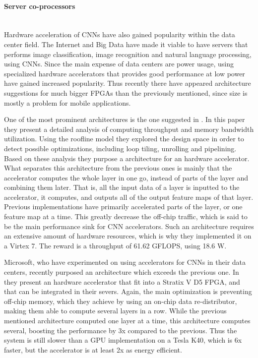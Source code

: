 \paragraph{Server co-processors} \hfil \\
Hardware acceleration of CNNs have also gained popularity within the data center field. The Internet and Big Data have made it viable to have servers that performs image classification, image recognition and natural language processing, using CNNs. Since the main expense of data centers are power usage, using specialized hardware accelerators that provides good performance at low power have gained increased popularity. Thus recently there have appeared architecture suggestions for much bigger FPGAs than the previously mentioned, since size is mostly a problem for mobile applications. 

One of the most prominent architectures is the one suggested in \cite{Zhang2015}. In this paper they present a detailed analysis of computing throughput and memory bandwidth utilization. Using the roofline model \cite{Williams2009} they explored the design space in order to detect possible optimizations, including loop tiling, unrolling and pipelining. Based on these analysis they purpose a architecture for an hardware accelerator. What separates this architecture from the previous ones is mainly that the accelerator computes the whole layer in one go, instead of parts of the layer and combining them later. That is, all the input data of a layer is inputted to the accelerator, it computes, and outputs all of the output feature maps of that layer. Previous implementations have primarily accelerated parts of the layer, or one feature map at a time. This greatly decrease the off-chip traffic, which is said to be the main performance sink for CNN accelerators. Such an architecture requires an extensive amount of hardware resources, which is why they implemented it on a Virtex 7. The reward is a throughput of 61.62 GFLOPS, using 18.6 W.   

Microsoft, who have experimented on using accelerators for CNNs in their data centers, recently purposed an architecture which exceeds the previous one. In \cite{Ovtcharov2015} they present an hardware accelerator that fit into a Stratix V D5 FPGA, and that can be integrated in their severs. Again, the main optimization is preventing off-chip memory, which they achieve by using an on-chip data re-distributor, making them able to compute several layers in a row. While the previous mentioned architecture computed one layer at a time, this architecture computes several, boosting the performance by 3x compared to the previous. Thus the system is still slower than a GPU implementation on a Tesla K40, which is 6x faster, but the accelerator is at least 2x as energy efficient.
 

